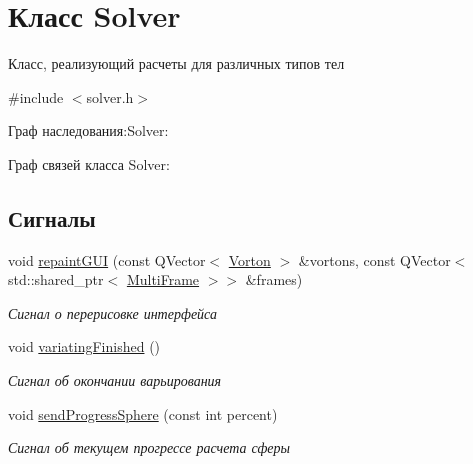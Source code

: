 \hypertarget{class_solver}{}\section{Класс Solver}
\label{class_solver}


Класс, реализующий расчеты для различных типов тел  




{\ttfamily \#include $<$solver.\+h$>$}



Граф наследования\+:Solver\+:


Граф связей класса Solver\+:
\subsection*{Сигналы}
\begin{DoxyCompactItemize}
\item 
\mbox{\label{class_solver_a2db7492d3c48a426fa2aa16a42086451}} 
void \mbox{\hyperlink{class_solver_a2db7492d3c48a426fa2aa16a42086451}{repaint\+G\+UI}} (const Q\+Vector$<$ \mbox{\hyperlink{class_vorton}{Vorton}} $>$ \&vortons, const Q\+Vector$<$ std\+::shared\+\_\+ptr$<$ \mbox{\hyperlink{class_multi_frame}{Multi\+Frame}} $>$$>$ \&frames)
\begin{DoxyCompactList}\small\item\em Сигнал о перерисовке интерфейса \end{DoxyCompactList}\item 
\mbox{\label{class_solver_a52797f377ea96437322287a0eabb55f7}} 
void \mbox{\hyperlink{class_solver_a52797f377ea96437322287a0eabb55f7}{variating\+Finished}} ()
\begin{DoxyCompactList}\small\item\em Сигнал об окончании варьирования \end{DoxyCompactList}\item 
\mbox{\label{class_solver_a2e2ba42280ede8c2d2e6648d4febb6cb}} 
void \mbox{\hyperlink{class_solver_a2e2ba42280ede8c2d2e6648d4febb6cb}{send\+Progress\+Sphere}} (const int percent)
\begin{DoxyCompactList}\small\item\em Сигнал об текущем прогрессе расчета сферы \end{DoxyCompactList}\item 
$$
\end{DoxyCompactItemize}
